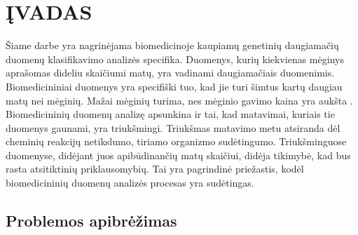 
\newpage
\section*{ĮVADAS}
\label{ivadas}



Šiame darbe yra nagrinėjama biomedicinoje kaupiamų genetinių daugiamačių duomenų klasifikavimo analizės specifika. Duomenys, kurių kiekvienas mėginys aprašomas dideliu skaičiumi matų, yra vadinami daugiamačiais duomenimis. Biomedicininiai duomenys yra specifiški tuo, kad jie turi šimtus kartų daugiau matų nei mėginių. Mažai mėginių turima, nes mėginio gavimo kaina yra aukšta \cite{pettersson2009generations}. Biomedicininių duomenų analizę apsunkina ir tai, kad matavimai, kuriais tie duomenys gaunami, yra triukšmingi. Triukšmas matavimo metu atsiranda dėl cheminių reakcijų netikslumo, tiriamo organizmo sudėtingumo. Triukšminguose duomenyse, didėjant juos apibūdinančių matų skaičiui, didėja tikimybė, kad bus rasta atsitiktinių priklausomybių. Tai yra pagrindinė priežastis, kodėl biomedicininių duomenų analizės procesas yra sudėtingas.



\subsection*{Problemos apibrėžimas}

